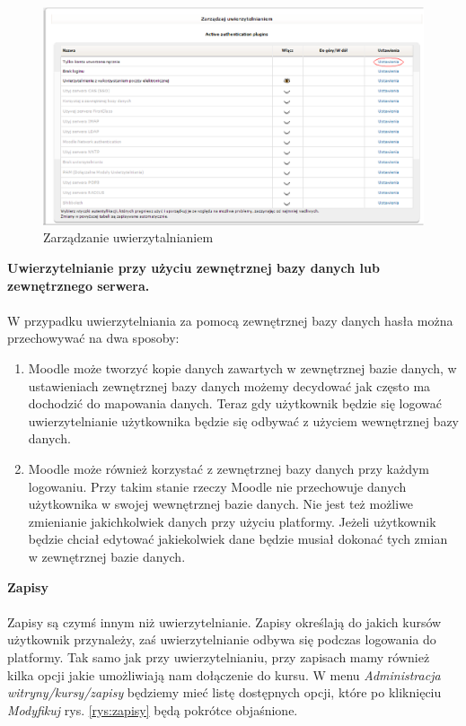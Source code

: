 \begin{figure}[!h]
	\centering
		\caption{Zarządzanie uwierzytalnianiem} \label{rys:info_uwierz}
		\includegraphics[width=1\textwidth]{projekt_sys//rys//uwierz.eps}
\end{figure}
\textbf{Uwierzytelnianie przy użyciu zewnętrznej bazy danych lub zewnętrznego serwera.}\\
\ \\
W przypadku uwierzytelniania za pomocą zewnętrznej bazy danych hasła można przechowywać na dwa sposoby: \\
\begin{enumerate}
	\item Moodle może tworzyć kopie danych zawartych w zewnętrznej bazie danych, w ustawieniach zewnętrznej bazy danych możemy decydować jak często ma dochodzić do mapowania danych. Teraz gdy użytkownik będzie się logować uwierzytelnianie użytkownika będzie się odbywać z użyciem wewnętrznej bazy danych.
	\item Moodle może również korzystać z zewnętrznej bazy danych przy każdym logowaniu. Przy takim stanie rzeczy Moodle nie przechowuje danych użytkownika w swojej wewnętrznej bazie danych. Nie jest też możliwe zmienianie jakichkolwiek danych przy użyciu platformy. Jeżeli użytkownik będzie chciał edytować jakiekolwiek dane będzie musiał dokonać tych zmian w zewnętrznej bazie danych.
\end{enumerate}
\textbf{Zapisy} \\
\ \\
Zapisy są czymś innym niż uwierzytelnianie. Zapisy określają do jakich kursów użytkownik przynależy, zaś uwierzytelnianie odbywa się podczas logowania do platformy. Tak samo jak przy uwierzytelnianiu, przy zapisach mamy również kilka opcji jakie umożliwiają nam dołączenie do kursu. W menu \textit{Administracja witryny/kursy/zapisy} będziemy mieć listę dostępnych opcji, które po kliknięciu \textit{Modyfikuj} rys. \ref{rys:zapisy} będą pokrótce objaśnione.\\
